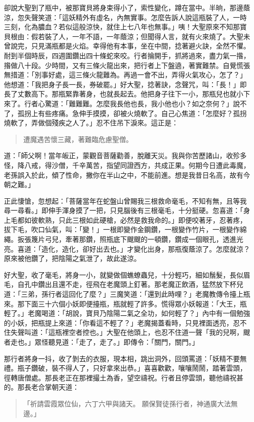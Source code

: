 卻說大聖到了瓶中，被那寶貝將身束得小了，索性變化，蹲在當中。半晌，那邊蔭涼，忽失聲笑道：「這妖精外有虛名，內無實事。怎麼告訴人說這瓶裝了人，一時三刻，化為膿血？若似這般涼快，就住上七八年也無事。」咦！大聖原來不知那寶貝根由：假若裝了人，一年不語，一年蔭涼；但聞得人言，就有火來燒了。大聖未曾說完，只見滿瓶都是火焰。幸得他有本事，坐在中間，捻著避火訣，全然不懼。耐到半個時辰，四週圍鑽出四十條蛇來咬。行者掄開手，抓將過來，盡力氣一揝，揝做八十段。少時間，又有三條火龍出來，把行者上下盤遶，著實難禁。自覺慌張無措道：「別事好處，這三條火龍難為。再過一會不出，弄得火氣攻心，怎了？」他想道：「我把身子長一長，券破罷。」好大聖，捻著訣，念聲咒，叫：「長！」即長了丈數高下。那瓶緊靠著身，也就長起去。他把身子往下一小，那瓶兒也就小下來了。行者心驚道：「難難難。怎麼我長他也長，我小他也小？如之奈何？」說不了，孤拐上有些疼痛。急伸手摸摸，卻被火燒軟了。自己心焦道：「怎麼好？孤拐燒軟了，弄做個殘疾之人了。」忍不住吊下淚來。這正是：
\begin{quote}
遭魔遇苦懷三藏，著難臨危慮聖僧。
\end{quote}

道：「師父啊！當年皈正，蒙觀音菩薩勸善，脫離天災。我與你苦歷諸山，收殄多怪，降八戒，得沙僧，千辛萬苦，指望同證西方，共成正果。何期今日遭此毒魔，老孫誤入於此，傾了性命，撇你在半山之中，不能前進。想是我昔日名高，故有今朝之難。」

正此悽愴，忽想起：「菩薩當年在蛇盤山曾賜我三根救命毫毛，不知有無，且等我尋一尋看。」即伸手渾身摸了一把，只見腦後有三根毫毛，十分挺硬。忽喜道：「身上毛都如彼軟熟，只此三根如此硬槍，必然是救我命的。」即便咬著牙，忍著疼，拔下毛，吹口仙氣，叫：「變！」一根即變作金鋼鑽，一根變作竹片，一根變作綿繩。扳張篾片弓兒，牽著那鑽，照瓶底下颼颼的一頓鑽，鑽成一個眼孔，透進光亮。喜道：「造化，造化，卻好出去也。」才變化出身，那瓶復蔭涼了。怎麼就涼？原來被他鑽了，把陰陽之氣泄了，故此遂涼。

好大聖，收了毫毛，將身一小，就變做個蟭蟟蟲兒，十分輕巧，細如鬚髮，長似眉毛，自孔中鑽出且還不走，徑飛在老魔頭上釘著。那老魔正飲酒，猛然放下杯兒道：「三弟，孫行者這回化了麼？」三魔笑道：「還到此時哩？」老魔教傳令擡上瓶來。那下面三十六個小妖即便擡瓶，瓶就輕了許多。慌得眾小妖報道：「大王，瓶輕了。」老魔喝道：「胡說，寶貝乃陰陽二氣之全功，如何輕了？」內中有一個勉強的小妖，把瓶提上來道：「你看這不輕了？」老魔揭蓋看時，只見裡面透亮，忍不住失聲叫道：「這瓶裡空者控也。」大聖在他頭上，也忍不住道一聲「我的兒啊，颼者走也。」眾怪聽見道：「走了，走了。」即傳令：「關門，關門。」

那行者將身一抖，收了剝去的衣服，現本相，跳出洞外，回頭罵道：「妖精不要無禮。瓶子鑽破，裝不得人了，只好拿來出恭。」喜喜歡歡，嚷嚷鬧鬧，踏著雲頭，徑轉唐僧處。那長老正在那裡撮土為香，望空禱祝。行者且停雲頭，聽他禱祝甚的。那長老合掌朝天道：
\begin{quote}
「祈請雲霞眾位仙，六丁六甲與諸天。
願保賢徒孫行者，神通廣大法無邊。」
\end{quote}

